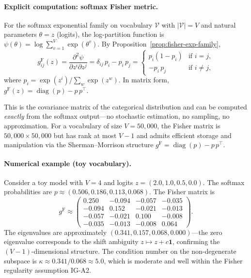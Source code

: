 \documentclass[11pt]{article}
\DeclareMathOperator{\diag}{diag}
\newcommand{\gF}{g^{\mathrm{F}}}
\theoremstyle{remark}
\begin{document}
\paragraph{Explicit computation: softmax Fisher metric.}
For the softmax exponential family on vocabulary $\mathcal{V}$ with
$|\mathcal{V}| = V$ and natural parameters $\theta = z$ (logits), the
log-partition function is $\psi(\theta) = \log \sum_{v=1}^V \exp(\theta^v)$.
By Proposition~\ref{prop:fisher-exp-family},
\begin{equation}\label{eq:softmax-fisher-explicit}
\gF_{ij}(z) = \frac{\partial^2 \psi}{\partial z^i \partial z^j}
= \delta_{ij}\, p_i - p_i\, p_j
= \begin{cases}
p_i(1-p_i) & \text{if } i = j, \\
-p_i\, p_j & \text{if } i \neq j,
\end{cases}
\end{equation}
where $p_i = \exp(z^i)/\sum_w \exp(z^w)$.  In matrix form,
$\gF(z) = \diag(p) - p\, p^\top$.

This is the covariance matrix of the categorical distribution and can be
computed \emph{exactly} from the softmax output---no stochastic estimation,
no sampling, no approximation.  For a vocabulary of size $V = 50{,}000$, the
Fisher matrix is $50{,}000 \times 50{,}000$ but has rank at most $V-1$ and
admits efficient storage and manipulation via the Sherman--Morrison structure
$\gF = \diag(p) - p\,p^\top$.

\paragraph{Numerical example (toy vocabulary).}
Consider a toy model with $V = 4$ and logits $z = (2.0, 1.0, 0.5, 0.0)$.  The
softmax probabilities are $p \approx (0.506, 0.186, 0.113, 0.068)$.  The
Fisher matrix is
\[
\gF \approx
\begin{pmatrix}
0.250 & -0.094 & -0.057 & -0.035 \\
-0.094 & 0.152 & -0.021 & -0.013 \\
-0.057 & -0.021 & 0.100 & -0.008 \\
-0.035 & -0.013 & -0.008 & 0.064
\end{pmatrix}.
\]
The eigenvalues are approximately $(0.341, 0.157, 0.068, 0.000)$---the zero
eigenvalue corresponds to the shift ambiguity $z \mapsto z + c\mathbf{1}$,
confirming the $(V{-}1)$-dimensional structure.  The condition number on the
non-degenerate subspace is $\kappa \approx 0.341/0.068 \approx 5.0$, which is
moderate and well within the Fisher regularity assumption IG-A2.
\end{document}
